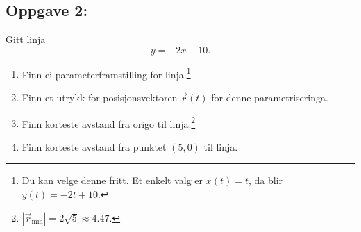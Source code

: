 \documentclass[a4paper,12pt]{article}
\begin{document}
\subsection*{Oppgave 2:}

Gitt linja
\[
y = -2x+10.
\]

\begin{enumerate}[label=\alph*)]
\item Finn ei parameterframstilling for linja.\footnote{Du kan velge denne fritt. Et enkelt valg er $x(t) = t$, da blir $y(t)=-2t +10$.}
\item Finn et utrykk for posisjonsvektoren $\vec r(t)$ for denne parametriseringa.
\item Finn korteste avstand fra origo til linja.\footnote{$|\vec r_\text{min}| = 2\sqrt 5 \approx 4.47.$}

\item Finn korteste avstand fra punktet $(5,0)$ til linja.
\end{enumerate}
\end{document}
